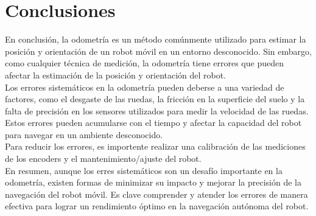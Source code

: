 \documentclass[oneside,onecolumn]{article}
\begin{document}
\section{Conclusiones}

En conclusión, la odometría es un método comúnmente utilizado para estimar la posición y orientación de un robot móvil en un entorno desconocido. Sin embargo, como cualquier técnica de medición, la odometría tiene errores que pueden afectar la estimación de la posición y orientación del robot.\\

Los errores sistemáticos en la odometría pueden deberse a una variedad de factores, como el desgaste de las ruedas, la fricción en la superficie del suelo y la falta de precisión en los sensores utilizados para medir la velocidad de las ruedas. Estos errores pueden acumularse con el tiempo y afectar la capacidad del robot para navegar en un ambiente desconocido.\\

Para reducir los errores, es importente realizar una calibración de las mediciones de los encoders y el mantenimiento/ajuste del robot.\\

En resumen, aunque los erres sistemáticos son un desafío importante en la odometría, existen formas de minimizar su impacto y mejorar la precisión de la navegación del robot móvil. Es clave comprender y atender los errores de manera efectiva para lograr un rendimiento óptimo en la navegación autónoma del robot.

\end{document}
